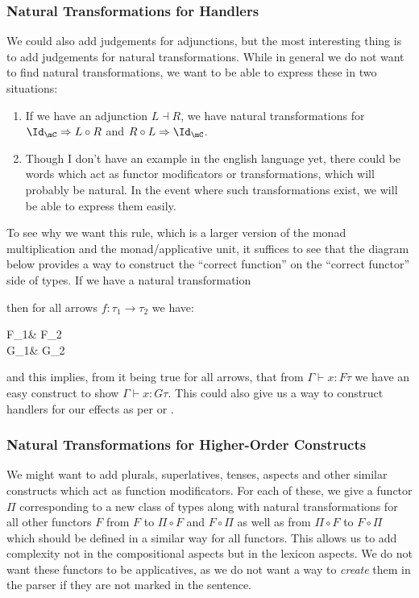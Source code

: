 \documentclass[math, english, info]{cours}
\def\cont{\Gamma\vdash}
\begin{document}
\subsubsection{Natural Transformations for Handlers}
We could also add judgements for adjunctions, but the most interesting thing is to add judgements for natural transformations.
While in general we do not want to find natural transformations, we want to be able to express these in two situations:
\begin{enumerate}
	\item If we have an adjunction $L\dashv R$, we have natural transformations for $\Id_{\mC} \Rightarrow L \circ R$ and $R\circ L \Rightarrow \Id_{\mC}$.
	\item Though I don't have an example in the english language yet, there could be words which act as functor modificators or transformations, which will probably be natural.
		In the event where such transformations exist, we will be able to express them easily.
\end{enumerate}
To see why we want this rule, which is a larger version of the monad multiplication and the monad/applicative unit, it suffices to see that the diagram below provides a way to construct the ``correct function'' on the ``correct functor'' side of types. If we have a natural transformation  then for all arrows $f: \tau_{1} \to \tau_{2}$ we have:
\begin{category}
	F\tau_{1}\ar[r, "Ff"] & F\tau_{2}\\
	G\tau_{1}\ar[r, "Gf"] & G\tau_{2}
\end{category}
and this implies, from it being true for all arrows, that from $\cont x: F\tau$ we have an easy construct to show $\cont x: G\tau$.
This could also give us a way to construct handlers for our effects as per \cite{bauerEffectSystemAlgebraic2014} or \cite{plotkinHandlingAlgebraicEffects2013}.

\subsubsection{Natural Transformations for Higher-Order Constructs}
We might want to add plurals, superlatives, tenses, aspects and other similar constructs which act as function modificators.
For each of these, we give a functor $\Pi$ corresponding to a new class of types along with natural transformations for all other functors $F$ from $F$ to $\Pi \circ F$ and $F\circ \Pi$ as well as from $\Pi \circ F$ to $F\circ \Pi$ which should be defined in a similar way for all functors.
This allows us to add complexity not in the compositional aspects but in the lexicon aspects.
We do not want these functors to be applicatives, as we do not want a way to \emph{create} them in the parser if they are not marked in the sentence.
\end{document}
